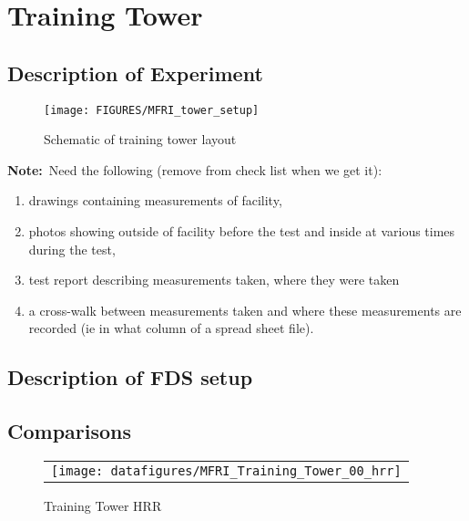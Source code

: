 \documentclass[11pt]{book}
\newcommand{\note}{{\bf Note:}}
\begin{document}

\chapter{Training Tower}

\section{Description of Experiment}
\begin{figure}[\figoptions]
\begin{center}
\texttt{[image: FIGURES/MFRI\_tower\_setup]}
\end{center}
\caption {Schematic of training tower layout}
\label{figtowerplan}%
\end{figure}

\note\ Need the following (remove from check list when we get it):
\begin{enumerate}
\item drawings containing measurements of facility,
\item photos showing outside of facility before the test and inside at various times during the test,
\item test report describing
measurements taken, where they were taken
\item a cross-walk between measurements taken and where these measurements are recorded (ie
in what column of a spread sheet file).
\end{enumerate}

\section{Description of FDS setup}


\section{Comparisons}
\begin{figure}[\figoptions]
\begin{center}
\begin{tabular}{c}
 \texttt{[image: datafigures/MFRI\_Training\_Tower\_00\_hrr]}\\
\end{tabular}
\end{center}
\caption {Training Tower HRR }
\label{figtrainingtowerhrr}%
\end{figure}
\end{document}
